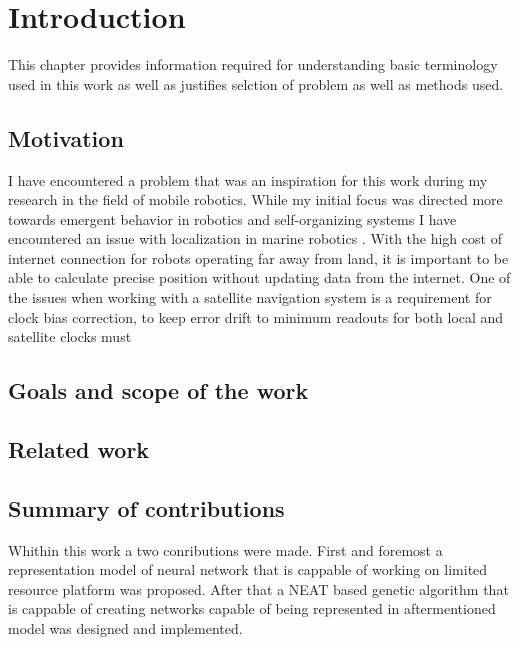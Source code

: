 \chapter{Introduction}
This chapter provides information required for understanding basic terminology used in this
work as well as justifies selction of problem as well as methods used.


\FloatBarrier
\section{Motivation}
I have encountered a problem that was an inspiration for this work during my research in the 
field of mobile robotics.
While my initial focus was directed more towards emergent behavior in robotics and self-organizing 
systems \cite{Gnys2017}\cite{Gnys2019} I have encountered an issue with localization in marine 
robotics \cite{Cabrera-Gamez2014}.
With the high cost of internet connection for robots operating far away from land, 
it is important to be able to calculate precise position without updating data from the internet.
One of the issues when working with a satellite navigation system is a requirement for clock bias
correction, to keep error drift to minimum readouts for both local and satellite clocks must

\FloatBarrier
\section{Goals and scope of the work}

\FloatBarrier
\section{Related work}


\FloatBarrier
\section{Summary of contributions}
Whithin this work a two conributions were made. First and foremost a representation model of
neural network that is cappable of working on limited resource platform was proposed.
After that a NEAT based genetic algorithm that is cappable of creating networks capable of being
represented in aftermentioned model was designed and implemented.

